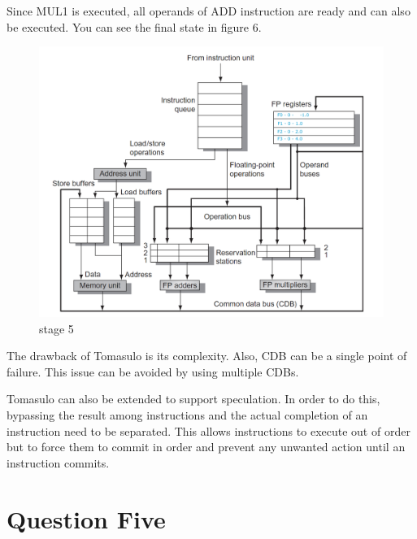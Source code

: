 \documentclass[12pt]{article}
\begin{document}
Since MUL1 is executed, all operands of ADD instruction are ready and can also be executed. You can see the final state in figure 6.

\begin{figure}[H]
	\centering
	\includegraphics[width=1\textwidth]{./images/tomas/e5.png}	
	\cprotect\caption{stage 5}
\end{figure}


The drawback of Tomasulo is its complexity. Also, CDB can be a single point of failure. This issue can be avoided by using multiple CDBs.

Tomasulo can also be extended to support speculation. In order to do this, bypassing the result among instructions and the actual completion of an instruction need to be separated. This allows instructions to execute
out of order but to force them to commit in order and prevent any unwanted action until an instruction commits.




\newpage

\section{Question Five}
\end{document}
